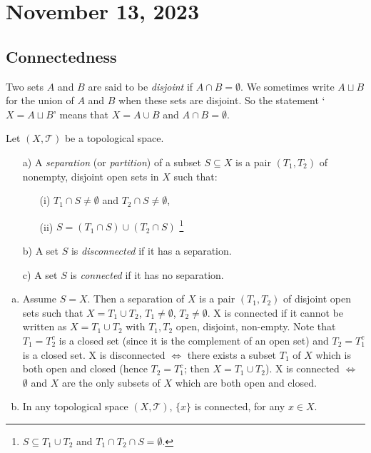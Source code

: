 \newpage
\section{November 13, 2023}
\subsection{Connectedness}

\begin{definition}[Disjoint]
    Two sets \( A \) and \( B \) are said to be \textit{disjoint} if \( A \cap B = \emptyset \). We sometimes write \( A \sqcup B \) for the union of \( A \) and \( B \) when these sets are disjoint. So the statement `\( X = A \sqcup B \)' means that \( X = A \cup B \) and \( A \cap B = \emptyset \).
\end{definition}


\begin{definition}
Let \((X, \mathcal{T})\) be a topological space.
    \begin{itemize}
        \item[a)] A \emph{separation} (or \emph{partition}) of a subset \( S \subseteq X \) is a pair \((T_1, T_2)\) of nonempty, disjoint open sets in \(X\) such that:
        \begin{enumerate}
            \item[(i)] \(T_1 \cap S \neq \emptyset\) and \(T_2 \cap S \neq \emptyset\),
            \item[(ii)] \(S = (T_1 \cap S) \cup (T_2 \cap S)\) \footnote{\(S \subseteq T_1 \cup T_2\) and \(T_1 \cap T_2 \cap S = \emptyset\).}
        \end{enumerate}
        \item[b)] A set \( S \) is \emph{disconnected} if it has a separation.
        \item[c)] A set \( S \) is \emph{connected} if it has no separation.
    \end{itemize}
\end{definition}


\begin{enumerate}[(a)]
    \item Assume \( S = X \). Then a separation of \( X \) is a pair \( (T_1, T_2) \) of disjoint open sets such that \( X = T_1 \cup T_2 \), \( T_1 \neq \emptyset \), \( T_2 \neq \emptyset \). X is connected if it cannot be written as \( X = T_1 \cup T_2 \) with \( T_1, T_2 \) open, disjoint, non-empty.
    Note that \( T_1 = T_2^c \) is a closed set (since it is the complement of an open set) and \( T_2 = T_1^c \) is a closed set. X is disconnected \( \Leftrightarrow \) there exists a subset \( T_1 \) of \( X \) which is both open and closed (hence \( T_2 = T_1^c \); then \( X = T_1 \cup T_2 \)). X is connected \( \Leftrightarrow \) \( \emptyset \) and \( X \) are the only subsets of \( X \) which are both open and closed.
    \item In any topological space \( (X, \mathcal{T}) \), \( \{x\} \) is connected, for any \( x \in X \).
\end{enumerate}

